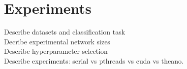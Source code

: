 \section{Experiments}
\label{Exp}

Describe datasets and classification task \\
Decribe experimental network sizes \\
Describe hyperparameter selection \\
Describe experiments: serial vs pthreads vs cuda vs theano.
